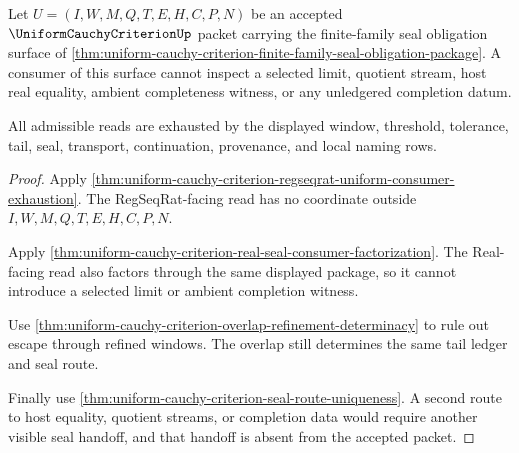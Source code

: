 \begin{theorem}
\label{thm:uniform-cauchy-criterion-finite-family-nonescape-ledger}
Let $U=(I,W,M,Q,T,E,H,C,P,N)$ be an accepted $\UniformCauchyCriterionUp$ packet carrying the finite-family seal obligation surface of \autoref{thm:uniform-cauchy-criterion-finite-family-seal-obligation-package}. A consumer of this surface cannot inspect a selected limit, quotient stream, host real equality, ambient completeness witness, or any unledgered completion datum.

All admissible reads are exhausted by the displayed window, threshold, tolerance, tail, seal, transport, continuation, provenance, and local naming rows.
\end{theorem}
\begin{proof}
Apply \autoref{thm:uniform-cauchy-criterion-regseqrat-uniform-consumer-exhaustion}. The RegSeqRat-facing read has no coordinate outside $I,W,M,Q,T,E,H,C,P,N$.

Apply \autoref{thm:uniform-cauchy-criterion-real-seal-consumer-factorization}. The Real-facing read also factors through the same displayed package, so it cannot introduce a selected limit or ambient completion witness.

Use \autoref{thm:uniform-cauchy-criterion-overlap-refinement-determinacy} to rule out escape through refined windows. The overlap still determines the same tail ledger and seal route.

Finally use \autoref{thm:uniform-cauchy-criterion-seal-route-uniqueness}. A second route to host equality, quotient streams, or completion data would require another visible seal handoff, and that handoff is absent from the accepted packet.
\end{proof}


